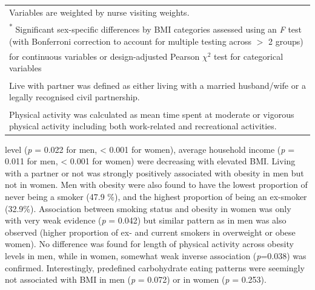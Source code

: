 \begin{table}
\begin{tabular}[t]{lcccccccc}
			\multicolumn{9}{l}{{\scriptsize Variables are weighted by nurse visiting weights.}}\\
			\multicolumn{9}{l}{{\scriptsize \textsuperscript{*} Significant sex-specific differences by BMI categories assessed using an \textit{F} test (with Bonferroni correction to account for multiple testing across $>$ 2 groups)}} \\ 
			\multicolumn{9}{l}{{\scriptsize for continuous variables or design-adjusted Pearson $\chi^2$ test for categorical variables}}\\
			\multicolumn{9}{l}{{\scriptsize \textsuperscript{\ddag} Live with partner was defined as either living with a married husband/wife or a legally recognised civil partnership.}}\\
			\multicolumn{9}{l}{{\scriptsize \textsuperscript{\dag} Physical activity was calculated as mean time spent at moderate or vigorous physical activity including both work-related and recreational activities.}}\\
		\end{tabular}
	
\end{table}

level (\textit{p} = 0.022 for men, < 0.001 for women), average household income (\textit{p} = 0.011 for men, < 0.001 for women) were decreasing with elevated BMI. Living with a partner or not was strongly positively associated with obesity in men but not in women. Men with obesity were also found to have the lowest proportion of never being a smoker (47.9 \%), and the highest proportion of being an ex-smoker (32.9\%). Association between smoking status and obesity in women was only with very weak evidence (\textit{p} = 0.042) but similar pattern as in men was also observed (higher proportion of ex- and current smokers in overweight or obese women). No difference was found for length of physical activity across obesity levels in men, while in women, somewhat weak inverse association (\textit{p}=0.038) was confirmed. Interestingly, predefined carbohydrate eating patterns were seemingly not associated with BMI in men (\textit{p} = 0.072) or in women (\textit{p} = 0.253). 


